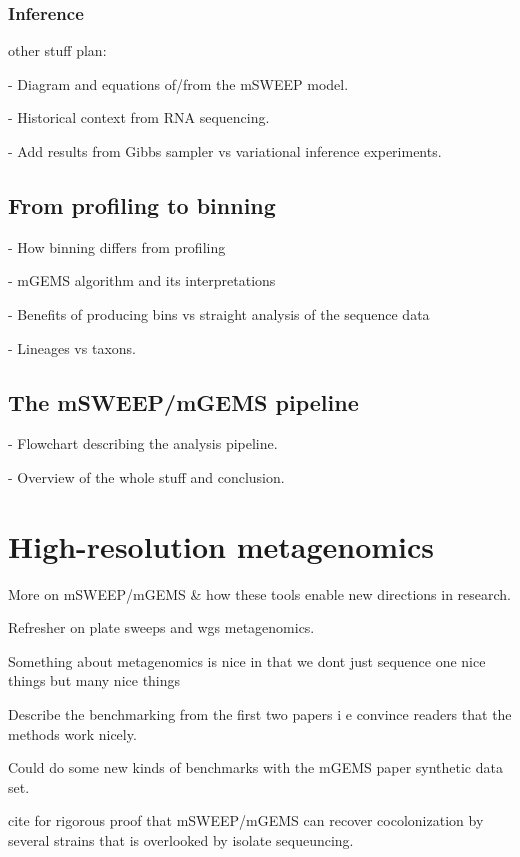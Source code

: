 \documentclass[officiallayout]{tktla}
\begin{document}
\subsection{Inference}

other stuff plan:

- Diagram and equations of/from the mSWEEP model.

- Historical context from RNA sequencing.

- Add results from Gibbs sampler vs variational inference experiments.

\section{From profiling to binning}

- How binning differs from profiling

- mGEMS algorithm and its interpretations

- Benefits of producing bins vs straight analysis of the sequence data

- Lineages vs taxons.

\section{The mSWEEP/mGEMS pipeline}

- Flowchart describing the analysis pipeline.

- Overview of the whole stuff and conclusion.

\chapter{High-resolution metagenomics}

More on mSWEEP/mGEMS \& how these tools enable new directions in research.

Refresher on plate sweeps and wgs metagenomics.

Something about metagenomics is nice in that we dont just sequence one
nice things but many nice things

Describe the benchmarking from the first two papers i e convince readers that the methods work nicely.

Could do some new kinds of benchmarks with the mGEMS paper synthetic data set.

cite \citet{tonkin-hill_pneumococcal_2022} for rigorous proof that
mSWEEP/mGEMS can recover cocolonization by several strains that is
overlooked by isolate sequeuncing.
\end{document}
